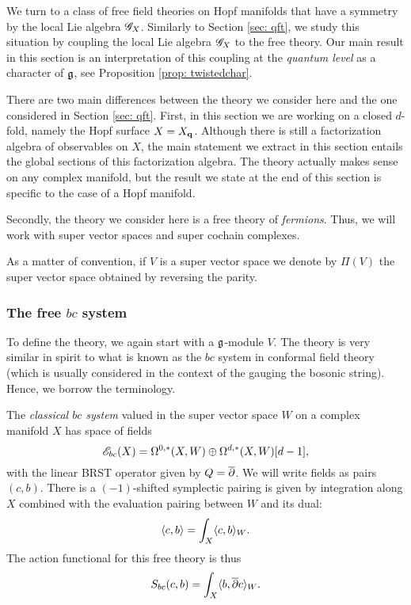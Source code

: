 \def\Cl{{\rm Cl}}

We turn to a class of free field theories on Hopf manifolds that have a symmetry by the local Lie algebra $\mathscr G_X$. 
Similarly to Section \ref{sec: qft}, we study this situation by coupling the local Lie algebra $\mathscr G_X$ to the free theory.
Our main result in this section is an interpretation of this coupling at the {\em quantum level} as a character of $\mathfrak g$, see Proposition \ref{prop: twistedchar}. 

There are two main differences between the theory we consider here and the one considered in Section \ref{sec: qft}.
First, in this section we are working on a closed $d$-fold, namely the Hopf surface $X = X_{\bf q}$. 
Although there is still a factorization algebra of observables on $X$, the main statement we extract in this section entails the global sections of this factorization algebra.
The theory actually makes sense on any complex manifold, but the result we state at the end of this section is specific to the case of a Hopf manifold. 

Secondly, the theory we consider here is a free theory of {\em fermions}. 
Thus, we will work with super vector spaces and super cochain complexes.

\begin{rmk}
As a matter of convention, if $V$ is a super vector space we denote by $\Pi(V)$ the super vector space obtained by reversing the parity. 
\end{rmk}

\subsubsection{The free $bc$ system}

To define the theory, we again start with a $\mathfrak g$-module $V$.
The theory is very similar in spirit to what is known as the $bc$ system in conformal field theory (which is usually considered in the context of the gauging the bosonic string). 
Hence, we borrow the terminology. 

\begin{dfn}
The {\em classical $bc$ system} valued in the super vector space $W$ on a complex manifold $X$ has space of fields
\[
\mathscr E_{bc} (X) = \Omega^{0,*}(X , W) \oplus \Omega^{d,*}(X , W)[d-1],
\]
with the linear BRST operator given by $Q = \overline{\partial}$.
We will write fields as pairs $(c,b)$. 
There is a $(-1)$-shifted symplectic pairing is given by integration along $X$ combined with the evaluation pairing between $W$ and its dual: 
\[
\langle c,b\rangle = \int_X \langle c, b\rangle_{W}.
\] 
The action functional for this free theory is thus
\[
S_{bc} (c,b) = \int_X \langle b , \overline{\partial} c\rangle_{W} .
\]
\end{dfn}

